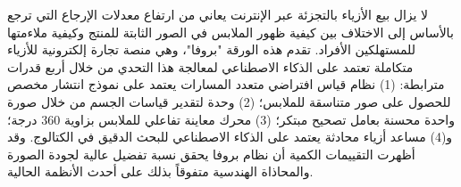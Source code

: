 \documentclass[11pt,a4paper]{article}
\begin{document}
\begin{arabtext}
لا يزال بيع الأزياء بالتجزئة عبر الإنترنت يعاني من ارتفاع معدلات الإرجاع التي ترجع بالأساس إلى الاختلاف بين كيفية ظهور الملابس في الصور الثابتة للمنتج وكيفية ملاءمتها للمستهلكين الأفراد. تقدم هذه الورقة "بروفا"، وهي منصة تجارة إلكترونية للأزياء متكاملة تعتمد على الذكاء الاصطناعي لمعالجة هذا التحدي من خلال أربع قدرات مترابطة: (1) نظام قياس افتراضي متعدد المسارات يعتمد على نموذج انتشار مخصص للحصول على صور متناسقة للملابس؛ (2) وحدة لتقدير قياسات الجسم من خلال صورة واحدة محسنة بعامل تصحيح مبتكر؛ (3) محرك معاينة تفاعلي للملابس بزاوية 360 درجة؛ و(4) مساعد أزياء محادثة يعتمد على الذكاء الاصطناعي للبحث الدقيق في الكتالوج. وقد أظهرت التقييمات الكمية أن نظام بروفا يحقق نسبة تفضيل عالية لجودة الصورة والمحاذاة الهندسية متفوقاً بذلك على أحدث الأنظمة الحالية.
\end{arabtext}
\end{document}
